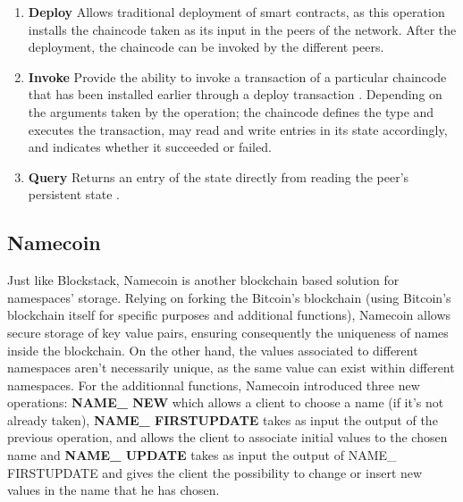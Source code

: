 \documentclass[a4paper]{article}
\begin{document}
\newpage
\begin{enumerate}
\item \textbf{Deploy} Allows traditional deployment of smart contracts, as this operation installs the chaincode taken as its input in the peers of the network. After the deployment, the chaincode can be invoked by the different peers.
\item \textbf{Invoke} Provide the ability to invoke a transaction of a particular chaincode that has been installed earlier through a deploy transaction \cite{hyper}. Depending on the arguments taken by the operation; the chaincode defines the type and executes the
transaction, may read and write entries in its state accordingly, and indicates whether it succeeded or
failed.
\item \textbf{Query} Returns an entry of the state directly from reading the peer’s persistent state \cite{hyper}.
\end{enumerate}
\subsection{Namecoin \cite{namecoin}}
Just like Blockstack, Namecoin is another blockchain based solution for namespaces' storage. Relying on forking the Bitcoin's blockchain (using Bitcoin's blockchain itself for specific purposes and additional functions), Namecoin allows secure storage of key value pairs, ensuring consequently the uniqueness of names inside the blockchain. On the other hand, the values associated to different namespaces aren't necessarily unique, as the same value can exist within different namespaces. For the additionnal functions, Namecoin introduced three new operations: \textbf{NAME\_ NEW} which allows a client to choose a name (if it's not already taken), \textbf{NAME\_ FIRSTUPDATE} takes as input the output of the previous operation, and allows the client to associate initial values to the chosen name and \textbf{NAME\_ UPDATE}  takes as input the output of NAME\_ FIRSTUPDATE and gives the client the possibility to change or insert new values in the name that he has chosen.
\end{document}
